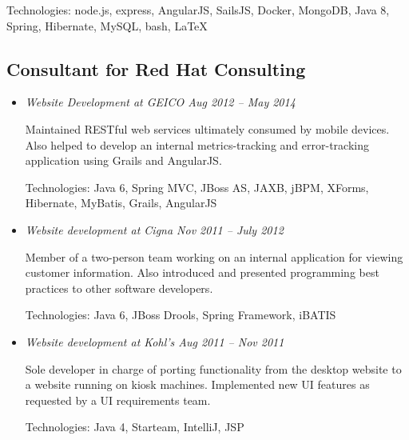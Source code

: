 \documentclass[a4paper,11pt]{article}
\begin{document}
Technologies: node.js, express, AngularJS, SailsJS, Docker, MongoDB, Java 8, Spring, Hibernate,
MySQL, bash, \LaTeX

\subsection*{Consultant for Red Hat Consulting}

  \vskip 5pt
  \begin{itemize}

    \item \textit{Website Development at GEICO \hfill Aug 2012 -- May 2014}

      Maintained RESTful web services ultimately consumed by mobile devices. Also helped to develop
      an internal metrics-tracking and error-tracking application using Grails and AngularJS.

      Technologies: Java 6, Spring MVC, JBoss AS, JAXB, jBPM, XForms, Hibernate, MyBatis, Grails,
      AngularJS

%

    \item \textit{Website development at Cigna \hfill Nov 2011 -- July 2012}

      Member of a two-person team working on an internal application for viewing customer
      information. Also introduced and presented programming best practices to other software
      developers.

      Technologies: Java 6, JBoss Drools, Spring Framework, iBATIS

    \item \textit{Website development at Kohl's \hfill Aug 2011 -- Nov 2011}

      Sole developer in charge of porting functionality from the desktop website to a website
      running on kiosk machines. Implemented new UI features as requested by a UI requirements team.

      Technologies: Java 4, Starteam, IntelliJ, JSP

  \end{itemize}
\end{document}
